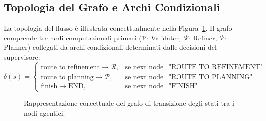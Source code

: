\subsection{Topologia del Grafo e Archi Condizionali}
La topologia del flusso è illustrata concettualmente nella Figura~\ref{fig:grafo_langgraph}. Il grafo comprende tre nodi computazionali primari ($\mathcal{V}$: Validator, $\mathcal{R}$: Refiner, $\mathcal{P}$: Planner) collegati da archi condizionali determinati dalle decisioni del supervisore:
\begin{equation}
\delta(s) = \begin{cases}
    \text{route\_to\_refinement} \rightarrow \mathcal{R}, & \text{se } \text{next\_node} = \text{"ROUTE\_TO\_REFINEMENT"} \\
    \text{route\_to\_planning} \rightarrow \mathcal{P}, & \text{se } \text{next\_node} = \text{"ROUTE\_TO\_PLANNING"} \\
    \text{finish} \rightarrow \text{END}, & \text{se } \text{next\_node} = \text{"FINISH"}
\end{cases}
\end{equation}

\begin{figure}[htbp]
\centering
{}
\caption{Rappresentazione concettuale del grafo di transizione degli stati tra i nodi agentici.}
\label{fig:grafo_langgraph}
\end{figure}

